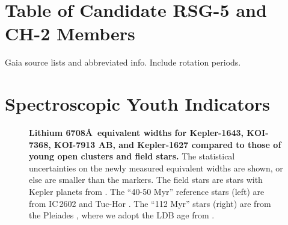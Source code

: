 \documentclass[12pt,twocolumn,linenumbers]{aastex63}
\begin{document}
% 
% 
% 
% 

\clearpage
                            
 

\appendix
\section{Table of Candidate RSG-5 and CH-2 Members}
\label{app:members}

Gaia source lists and abbreviated info.  Include rotation periods.

\section{Spectroscopic Youth Indicators}
\label{app:spectra}

\begin{figure}[tp]
	\begin{center}
		\leavevmode
	\end{center}
	\vspace{-0.3cm}
	\caption{
    {\bf Lithium 6708\AA\ equivalent widths for Kepler-1643, KOI-7368,
    KOI-7913 AB, and Kepler-1627 compared to those of young open
    clusters and field stars. }
    The statistical uncertainties on the newly measured equivalent
    widths are shown, or else are smaller than the markers.
    The field stars are stars with Kepler planets from \citet{berger_identifying_2018}.
    The ``40-50 Myr'' reference stars (left) are from
		IC\,2602 \citep{randich_gaiaeso_2018} and Tuc-Hor
		\citep{kraus_stellar_2014}.
    The ``112 Myr'' stars (right) are from the Pleiades
    \citep{soderblom_evolution_1993,jones_evolution_1996,bouvier_pleiades_lirot_2018},
    where we adopt the LDB age from \citet{dahm_2015}.
    \label{fig:lithium}
	}
\end{figure}
\end{document}
